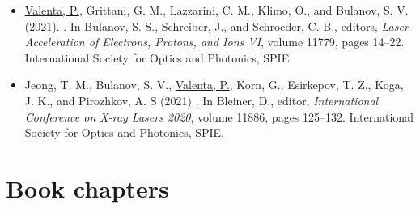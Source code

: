 \documentclass[10pt, a4paper, twoside, openright]{report}
\newcommand{\link}[3][blue]{\href{#2}{\color{#1}{#3}}}%
\begin{document}
\begin{itemize}
	\item \underline{Valenta, P.}, Grittani, G. M., Lazzarini, C. M., Klimo, O., and Bulanov, S. V. (2021). \link{https://doi.org/10.1117/12.2589222}{Ring-shaped electron beams from laser-wakefield accelerator}. In Bulanov, S. S., Schreiber, J., and Schroeder, C. B., editors, \textit{Laser Acceleration of Electrons, Protons, and Ions VI}, volume 11779, pages 14--22. International Society for Optics and Photonics, SPIE.
	
	\item Jeong, T. M., Bulanov, S. V., \underline{Valenta, P.}, Korn, G., Esirkepov, T. Z., Koga, J. K., and Pirozhkov, A. S (2021) \link{https://doi.org/10.1117/12.2592047}{Ultra-strong attosecond laser focus produced by a relativistic-flying parabolic mirror}. In Bleiner, D., editor, \textit{International Conference on X-ray Lasers 2020}, volume 11886, pages 125--132. International Society for Optics and Photonics, SPIE. 
	
\end{itemize}

\section{Book chapters\label{sec:book_chapters}}
\end{document}
